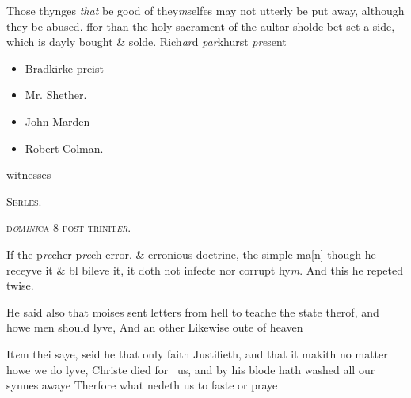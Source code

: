 \documentclass[12pt, a4paper]{book}
\begin{document}
		\ifthenelse{\isodd{\thepage}}
		{\reversemarginpar}
		{\normalmarginpar}
		Those thynges \textit{that} be good of they\textit{m}selfes may not utterly
 be put away, although they be abused. ffor than the
 holy sacrament of the aultar sholde bet set a side,
 which is dayly bought \& solde. Rich\textit{ar}d \textit{par}khurst \textit{pre}sent


	\begin{itemize}
		\item[]Bradkirke preist
		\item[]Mr. Shether.
		\item[]John Marden
		\item[]Robert Colman.
	\end{itemize}
	
		\ifthenelse{\isodd{\thepage}}
		{\reversemarginpar}
		{\normalmarginpar}
		 witnesses

 

            
               
				\begin{center} \begin{large} {\scshape Serles. } \end{large} \end{center}
			
               
                  
				\begin{center}  {\scshape 
                     d\textit{o}m\textit{ini}ca 8 post trinit\textit{er}.
                  }  \end{center}
			


		\ifthenelse{\isodd{\thepage}}
		{\reversemarginpar}
		{\normalmarginpar}
		If the p\textit{re}cher p\textit{re}ch error. \& erronious doctrine, the simple ma[n]
 though he receyve it \& bl bileve it, it doth not infecte
 nor corrupt hy\textit{m}. And this he repeted twise.
 
		\ifthenelse{\isodd{\thepage}}
		{\reversemarginpar}
		{\normalmarginpar}
		He said also that moises sent letters from hell to teache
 the state therof, and howe men should lyve, And an other
 Likewise oute of heaven
               	
				\marginpar[\vspace{0.5cm}{\textcolor{Gray}{sclaunderous}}]{}
			
		\ifthenelse{\isodd{\thepage}}
		{\reversemarginpar}
		{\normalmarginpar}
		It\textit{e}m thei saye, seid he that only faith Justifieth, and that
 it makith no matter howe we do lyve, Christe died for 
 us, and by his blode hath washed all our synnes awaye
 Therfore what nedeth us to faste or praye
 
\end{document}
